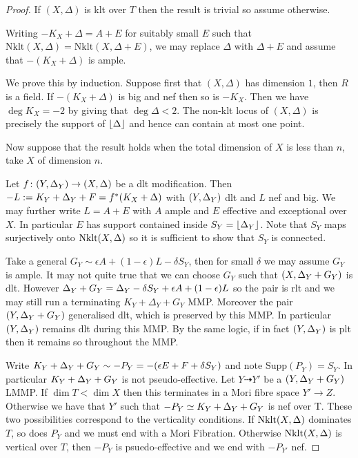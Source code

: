 \begin{proof}
	
	If $(X,\Delta)$ is klt over $T$ then the result is trivial so assume otherwise.
	
	Writing $-K_{X}+\Delta=A+E$ for suitably small $E$ such that $\text{Nklt}(X,\Delta)=\text{Nklt}(X,\Delta+E)$, we may replace $\Delta$ with $\Delta+E$ and assume that $-(K_{X}+\Delta)$ is ample. 
		
	We prove this by induction. Suppose first that $(X,\Delta)$ has dimension $1$, then $R$ is a field. If $-(K_{X}+\Delta)$ is big and nef then so is $-K_{X}$. Then we have $\deg K_{X} = -2$ by \cite[Corollary 2.8]{tanaka2018minimal} giving that $ \deg \Delta <2$. The non-klt locus of $(X,\Delta)$ is precisely the support of $\lfloor \Delta \rfloor$ and hence can contain at most one point.
	
	Now suppose that the result holds when the total dimension of $X$ is less than $n$, take $X$ of dimension $n$.
	
	Let $f \colon (Y,\Delta_{Y}) \to (X,\Delta)$ be a dlt modification. Then $-L:=K_{Y}+\Delta_{Y}+F=f^{*}(K_{X}+\Delta)$ with $(Y,\Delta_{Y})$ dlt and $L$ nef and big. We may further write $L=A+E$ with $A$ ample and $E$ effective and exceptional over $X$. In particular $E$ has support contained inside $S_{Y}=\lfloor \Delta_{Y} \rfloor$. Note that $S_{Y}$ maps surjectively onto $\textup{Nklt}(X,\Delta)$ so it is sufficient to show that $S_{Y}$ is connected.
	
	Take a general $G_{Y} \sim \epsilon A +(1-\epsilon) L-\delta S_{Y}$, then for small $\delta$ we may assume $G_{Y}$ is ample. It may not quite true that we can choose $G_{Y}$ such that $(X,\Delta_{Y}+G_{Y})$ is dlt. However $\Delta_{Y}+G_{Y}=\Delta_{Y}-\delta S_{Y} +\epsilon A + (1-\epsilon)L$ so the pair is rlt and we may still run a terminating $K_{Y}+\Delta_{Y}+G_{Y}$ MMP. Moreover the pair $(Y,\Delta_{Y}+G_{Y})$ generalised dlt, which is preserved by this MMP. In particular $(Y,\Delta_{Y})$ remains dlt during this MMP. By the same logic, if in fact $(Y,\Delta_{Y})$ is plt then it remains so throughout the MMP.
	
	Write $K_{Y}+\Delta_{Y}+G_{Y}\sim - P_{Y}=-(\epsilon E + F + \delta S_{Y})$ and note $\text{Supp}(P_{Y})=S_{Y}$. In particular $K_{Y}+\Delta_{Y}+G_{Y}$ is not pseudo-effective. Let $Y \dashrightarrow Y'$ be a $(Y,\Delta_{Y}+G_{Y})$ LMMP. If $\dim T < \dim X$ then this terminates in a Mori fibre space $Y' \to Z$. Otherwise we have that $Y'$ such that $-P_{Y}\simeq K_{Y}+\Delta_{Y}+G_{Y}$ is nef over T. These two possibilities correspond to the verticality conditions. If $\textup{Nklt}(X,\Delta)$ dominates $T$, so does $P_{Y}$ and we must end with a Mori Fibration. Otherwise $\textup{Nklt}(X,\Delta)$ is vertical over $T$, then $-P_{Y}$ is psuedo-effective and we end with $-P_{Y'}$ nef.
	

\end{proof}
